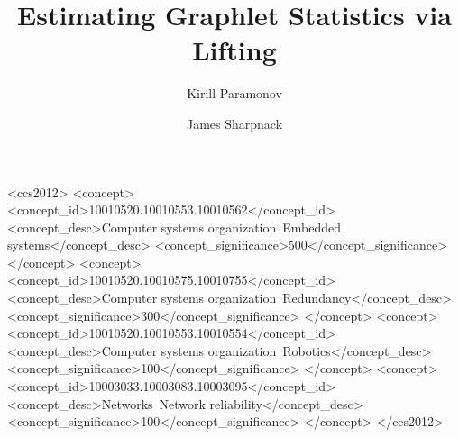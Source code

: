 \documentclass[sigconf]{acmart}
\begin{document}
\title{Estimating Graphlet Statistics via Lifting}

\author{Kirill Paramonov}


\author{James Sharpnack}

\begin{abstract}
	\lipsum[1-1]
\end{abstract}

%
%
\begin{CCSXML}
<ccs2012>
 <concept>
  <concept_id>10010520.10010553.10010562</concept_id>
  <concept_desc>Computer systems organization~Embedded systems</concept_desc>
  <concept_significance>500</concept_significance>
 </concept>
 <concept>
  <concept_id>10010520.10010575.10010755</concept_id>
  <concept_desc>Computer systems organization~Redundancy</concept_desc>
  <concept_significance>300</concept_significance>
 </concept>
 <concept>
  <concept_id>10010520.10010553.10010554</concept_id>
  <concept_desc>Computer systems organization~Robotics</concept_desc>
  <concept_significance>100</concept_significance>
 </concept>
 <concept>
  <concept_id>10003033.10003083.10003095</concept_id>
  <concept_desc>Networks~Network reliability</concept_desc>
  <concept_significance>100</concept_significance>
 </concept>
</ccs2012>
\end{CCSXML}


\maketitle





\end{document}
